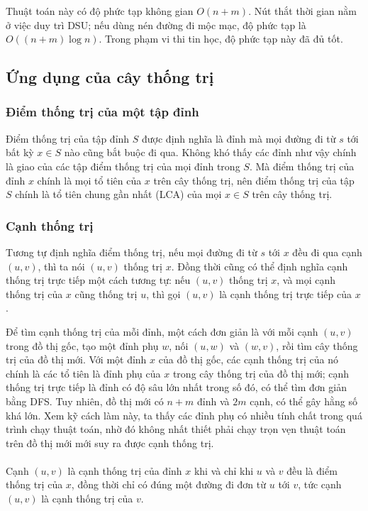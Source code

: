 \documentclass[11pt]{article}
\begin{document}
Thuật toán này có độ phức tạp không gian \(O(n+m)\). Nút thắt thời gian nằm ở
việc duy trì DSU; nếu dùng nén đường đi mộc mạc, độ phức tạp là
\(O((n+m)\log n)\). Trong phạm vi thi tin học, độ phức tạp này đã đủ tốt.

\subsection{Ứng dụng của cây thống trị}

\subsubsection{Điểm thống trị của một tập đỉnh}

Điểm thống trị của tập đỉnh \(S\) được định nghĩa là đỉnh mà mọi đường đi từ
\(s\) tới bất kỳ \(x\in S\) nào cũng bắt buộc đi qua. Không khó thấy các đỉnh
như vậy chính là giao của các tập điểm thống trị của mọi đỉnh trong \(S\). Mà
điểm thống trị của đỉnh \(x\) chính là mọi tổ tiên của \(x\) trên cây thống
trị, nên điểm thống trị của tập \(S\) chính là tổ tiên chung gần nhất (LCA) của
mọi \(x\in S\) trên cây thống trị.

\subsubsection{Cạnh thống trị}

Tương tự định nghĩa điểm thống trị, nếu mọi đường đi từ \(s\) tới \(x\) đều đi
qua cạnh \((u,v)\), thì ta nói \((u,v)\) thống trị \(x\). Đồng thời cũng có thể
định nghĩa cạnh thống trị trực tiếp một cách tương tự: nếu \((u,v)\) thống trị
\(x\), và mọi cạnh thống trị của \(x\) cũng thống trị \(u\), thì gọi \((u,v)\)
là cạnh thống trị trực tiếp của \(x\).

Để tìm cạnh thống trị của mỗi đỉnh, một cách đơn giản là với mỗi cạnh
\((u,v)\) trong đồ thị gốc, tạo một đỉnh phụ \(w\), nối \((u,w)\) và
\((w,v)\), rồi tìm cây thống trị của đồ thị mới. Với một đỉnh \(x\) của đồ thị
gốc, các cạnh thống trị của nó chính là các tổ tiên là đỉnh phụ của \(x\) trong
cây thống trị của đồ thị mới; cạnh thống trị trực tiếp là đỉnh có độ sâu lớn
nhất trong số đó, có thể tìm đơn giản bằng DFS. Tuy nhiên, đồ thị mới có
\(n+m\) đỉnh và \(2m\) cạnh, có thể gây hằng số khá lớn. Xem kỹ cách làm này,
ta thấy các đỉnh phụ có nhiều tính chất trong quá trình chạy thuật toán, nhờ đó
không nhất thiết phải chạy trọn vẹn thuật toán trên đồ thị mới mới suy ra được
cạnh thống trị.

\paragraph{}
Cạnh \((u,v)\) là cạnh thống trị của đỉnh \(x\) khi và chỉ khi \(u\) và \(v\)
đều là điểm thống trị của \(x\), đồng thời chỉ có đúng một đường đi đơn từ
\(u\) tới \(v\), tức cạnh \((u,v)\) là cạnh thống trị của \(v\).
\end{document}

